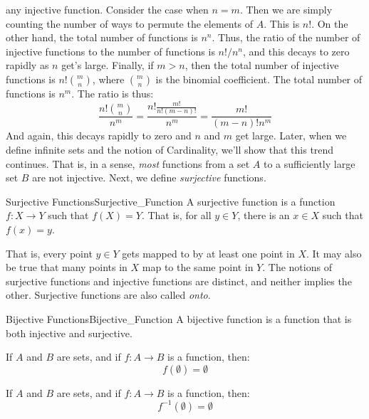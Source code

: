     any injective function. Consider the case when $n=m$.
    Then we are simply counting the number of ways to
    permute the elements of $A$. This is $n!$. On the
    other hand, the total number of functions is
    $n^{n}$. Thus, the ratio of the number of injective
    functions to the number of functions is
    $n!/n^{n}$, and this decays to zero rapidly as
    $n$ get's large. Finally, if $m>n$, then the total
    number of injective functions is
    $n!\binom{m}{n}$, where $\binom{m}{n}$ is the
    binomial coefficient. The total number of functions
    is $n^{m}$. The ratio is thus:
    \begin{equation}
        \frac{n!\binom{m}{n}}{n^{m}}=\frac{n!\frac{m!}{n!(m-n)!}}{n^{m}}
                                    =\frac{m!}{(m-n)!n^{m}}
    \end{equation}
    And again, this decays rapidly to zero and $n$ and $m$
    get large. Later, when we define infinite sets
    and the notion of Cardinality, we'll show that this
    trend continues. That is, in a sense, \textit{most}
    functions from a set $A$ to a sufficiently large set
    $B$ are not injective. Next, we define
    \textit{surjective} functions.
    \begin{ldefinition}{Surjective Functions}{Surjective_Function}
        A \gls{surjective function} is a function
        $f:X\rightarrow{Y}$ such that $f(X)=Y$.
        That is, for all $y\in{Y}$, there is an
        $x\in{X}$ such that $f(x)=y$.
    \end{ldefinition}
    That is, every point $y\in{Y}$ gets mapped to by
    at least one point in $X$. It may also be true that
    many points in $X$ map to the same point in $Y$.
    The notions of surjective functions and injective
    functions are distinct, and neither implies the
    other. Surjective functions are also called
    \textit{onto}.
    \begin{ldefinition}{Bijective Functions}{Bijective_Function}
        A \gls{bijective function} is a function
        that is both injective and surjective.
    \end{ldefinition}
    \begin{theorem}
        \label{thm:Image_of_Empty_Set_Is_Empty}%
        If $A$ and $B$ are sets, and if $f:A\rightarrow{B}$
        is a function, then:
        \begin{equation}
            f(\emptyset)=\emptyset
        \end{equation}
    \end{theorem}
    \begin{theorem}
        If $A$ and $B$ are sets, and if $f:A\rightarrow{B}$
        is a function, then:
        \begin{equation}
            f^{-1}(\emptyset)=\emptyset
        \end{equation}
    \end{theorem}
